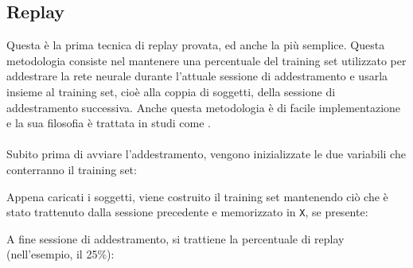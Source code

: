 \subsection{Replay}  %
Questa è la prima tecnica di replay provata, ed anche la più semplice. Questa metodologia consiste nel mantenere una percentuale del training set utilizzato per addestrare la rete neurale durante l'attuale sessione di addestramento e usarla insieme al training set, cioè alla coppia di soggetti, della sessione di addestramento successiva. Anche questa metodologia è di facile implementazione e la sua filosofia è trattata in studi come \cite{rolnick2019experience}.\\\\
Subito prima di avviare l'addestramento, vengono inizializzate le due variabili che conterranno il training set:

Appena caricati i soggetti, viene costruito il training set mantenendo ciò che è stato trattenuto dalla sessione precedente e memorizzato in \texttt{X}, se presente:

A fine sessione di addestramento, si trattiene la percentuale di replay (nell'esempio, il 25\%):


